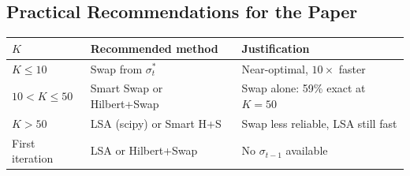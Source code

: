 \documentclass[11pt,a4paper]{article}
\begin{document}
\subsection{Practical Recommendations for the Paper}

\begin{center}
\begin{tabular}{lll}
\toprule
$K$ & Recommended method & Justification \\
\midrule
$K \le 10$  & Swap from $\sigma_t^*$ & Near-optimal, $10\times$ faster \\
$10 < K \le 50$ & Smart Swap or Hilbert+Swap & Swap alone: 59\% exact at $K=50$ \\
$K > 50$ & LSA (scipy) or Smart H+S & Swap less reliable, LSA still fast \\
\midrule
First iteration & LSA or Hilbert+Swap & No $\sigma_{t-1}$ available \\
\bottomrule
\end{tabular}
\end{center}
\end{document}
